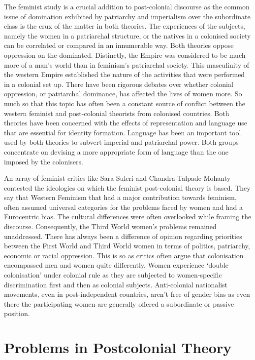 The feminist study is a crucial addition to post-colonial discourse as the common issue of domination exhibited by patriarchy and imperialism over the subordinate class is the crux of the matter in both theories. The experiences of the subjects, namely the women in a patriarchal structure, or the natives in a colonised society can be correlated or compared in an innumerable way. Both theories oppose oppression on the dominated. Distinctly, the Empire was considered to be much more of a man’s world than in feminism’s patriarchal society. This masculinity of the western Empire established the nature of the activities that were performed in a colonial set up. There have been rigorous debates over whether colonial oppression, or patriarchal dominance, has affected the lives of women more. So much so that this topic has often been a constant source of conflict between the western feminist and post-colonial theorists from colonised countries. Both theories have been concerned with the effects of representation and language use that are essential for identity formation. Language has been an important tool used by both theories to subvert imperial and patriarchal power. Both groups concentrate on devising a more appropriate form of language than the one imposed by the colonisers.

An array of feminist critics like Sara Suleri and Chandra Talpade Mohanty contested the ideologies on which the feminist post-colonial theory is based. They say that Western Feminism that had a major contribution towards feminism, often assumed universal categories for the problems faced by women and had a Eurocentric bias. The cultural differences were often overlooked while framing the discourse. Consequently, the Third World women’s problems remained unaddressed. There has always been a difference of opinion regarding priorities between the First World and Third World women in terms of politics, patriarchy, economic or racial oppression. This is so as critics often argue that colonisation encompassed men and women quite differently. Women experience ‘double colonisation’ under colonial rule as they are subjected to women-specific discrimination first and then as colonial subjects. Anti-colonial nationalist movements, even in post-independent countries, aren’t free of gender bias as even there the participating women are generally offered a subordinate or passive position. 

\section{Problems in Postcolonial Theory}

